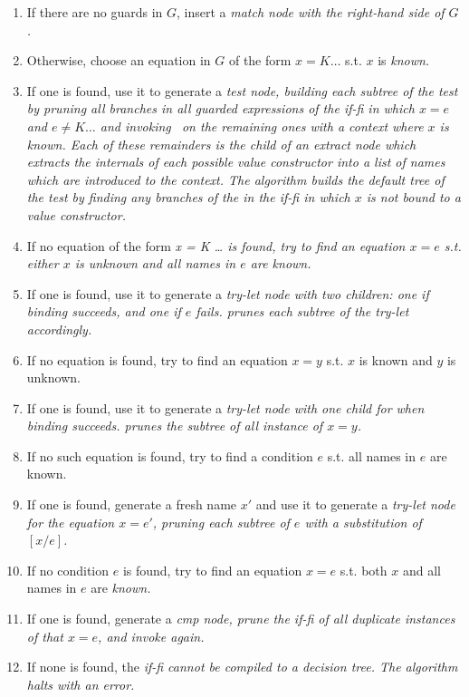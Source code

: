 \documentclass[manuscript,screen,review, 12pt, nonacm]{acmart}
\begin{document}
    \begin{enumerate}
        \item If there are no guards in $G$, insert a \it{match} node with the
        right-hand side of $G$. 
        \item Otherwise, choose an equation in $G$ of the form $x = K \dots$
        s.t. $x$ is \it{known}. 
        \item If one is found, use it to generate a \it{test} node, building
        each subtree of the \it{test} by pruning all branches in \it{all}
        guarded expressions of the \it{if-fi} in which $x = e$ and $e \neq K
        \dots$ and invoking \Compile\ on the remaining ones with a context where
        $x$ is known. Each of these remainders is the child of an \it{extract}
        node which extracts the internals of each possible value constructor
        into a list of names which are introduced to the context. The algorithm
        builds the default tree of the \it{test} by finding any branches of the
        in the \it{if-fi} in which $x$ is not bound to a value constructor. 
        \item If no equation of the form \it{x = K \dots} is found, try to find
        an equation $x = e$ s.t. either $x$ is unknown and all names in $e$ are
        known. 
        \item If one is found, use it to generate a \it{try-let} node with two
        children: one if binding succeeds, and one if $e$ fails. \Compile prunes
        each subtree of the \it{try-let} accordingly.
        \item If no equation is found, try to find an equation $x = y$ s.t. $x$
        is known and $y$ is unknown. 
        \item If one is found, use it to generate a \it{try-let} node with one
        child for when binding succeeds. \Compile prunes the subtree of all 
        instance of $x = y$. 
        \item If no such equation is found, try to find a condition $e$ s.t. all
        names in $e$ are known. 
        \item If one is found, generate a fresh name $x'$ and use it to generate
        a \it{try-let} node for the equation $x = e'$, pruning each subtree of
        $e$ with a substitution of $[x/e]$. 
        \item If no condition $e$ is found, try to find an equation $x = e$ s.t.
        both $x$ and all names in $e$ are \it{known}.
        \item If one is found, generate a \it{cmp} node, prune the \it{if-fi} of
        all duplicate instances of that $x = e$, and invoke \Compile again. 
        \item If none is found, the \it{if-fi} cannot be compiled to a decision
        tree. The algorithm halts with an error. 
    \end{enumerate}
    \raggedbottom
\end{document}
